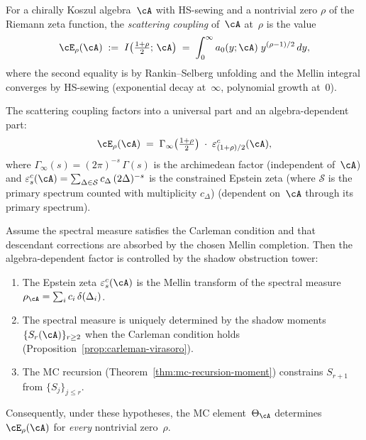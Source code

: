 \begin{definition}%
\label{def:scattering-coupling}%
%
For a chirally Koszul algebra~$\cA$ with HS-sewing and a
nontrivial zero $\rho$ of the Riemann zeta function, the
\emph{scattering coupling} of~$\cA$ at~$\rho$ is the value
\begin{equation}\label{eq:scattering-coupling}
 \cE_\rho(\cA)
 \;:=\;
 I\!\left(\tfrac{1{+}\rho}{2};\,\cA\right)
 \;=\;
 \int_0^\infty
 a_0(y;\cA)\;y^{(\rho-1)/2}\,dy,
\end{equation}
where the second equality is by Rankin--Selberg unfolding and
the Mellin integral converges by HS-sewing
\textup{(}exponential decay at~$\infty$, polynomial growth
at~$0$\textup{)}.
\end{definition}

\begin{theorem}%
\label{thm:scattering-coupling-factorization}%
%
The scattering coupling factors into a universal part and an
algebra-dependent part:
\begin{equation}\label{eq:scattering-factorization}
 \cE_\rho(\cA)
 \;=\;
 \Gamma_\infty\!\left(\tfrac{1{+}\rho}{2}\right)
 \;\cdot\;
 \varepsilon^c_{(1+\rho)/2}(\cA),
\end{equation}
where $\Gamma_\infty(s) = (2\pi)^{-s}\,\Gamma(s)$ is the
archimedean factor \textup{(}independent of~$\cA$\textup{)}
and $\varepsilon^c_s(\cA) = \sum_{\Delta\in\mathcal{S}}
c_\Delta\,(2\Delta)^{-s}$ is the constrained Epstein zeta
\textup{(}where $\mathcal{S}$ is the primary spectrum counted
with multiplicity $c_\Delta$\textup{)}
\textup{(}dependent on~$\cA$ through its primary
spectrum\textup{)}.

Assume the spectral measure satisfies the Carleman condition and that
descendant corrections are absorbed by the chosen Mellin completion.
Then the algebra-dependent factor is controlled by the shadow
obstruction tower:
\begin{enumerate}[label=\textup{(\roman*)}]
\item The Epstein zeta
 $\varepsilon^c_s(\cA)$ is the Mellin transform of the
 spectral measure $\rho_\cA = \sum_i c_i\,\delta(\Delta_i)$.
\item The spectral measure is uniquely determined by the
 shadow moments $\{S_r(\cA)\}_{r\ge 2}$ when the Carleman
 condition holds \textup{(}Proposition~\textup{\ref{prop:carleman-virasoro}}\textup{)}.
\item The MC recursion
 \textup{(}Theorem~\textup{\ref{thm:mc-recursion-moment}}\textup{)}
 constrains $S_{r+1}$ from $\{S_j\}_{j \le r}$.
\end{enumerate}
Consequently, under these hypotheses, the MC element~$\Theta_\cA$ determines
$\cE_\rho(\cA)$ for \emph{every} nontrivial zero~$\rho$.
\end{theorem}

